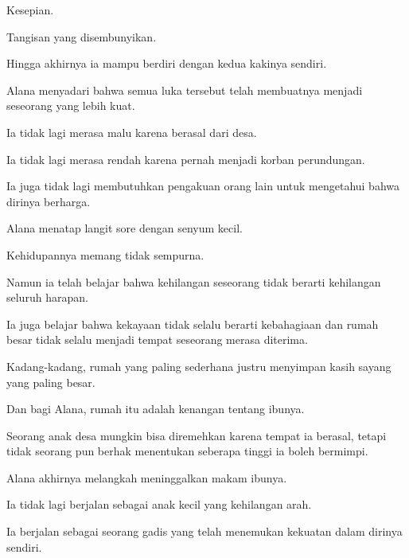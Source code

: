 Kesepian.

Tangisan yang disembunyikan.

Hingga akhirnya ia mampu berdiri dengan kedua kakinya sendiri.

Alana menyadari bahwa semua luka tersebut telah membuatnya menjadi seseorang yang lebih kuat.

Ia tidak lagi merasa malu karena berasal dari desa.

Ia tidak lagi merasa rendah karena pernah menjadi korban perundungan.

Ia juga tidak lagi membutuhkan pengakuan orang lain untuk mengetahui bahwa dirinya berharga.

Alana menatap langit sore dengan senyum kecil.

Kehidupannya memang tidak sempurna.

Namun ia telah belajar bahwa kehilangan seseorang tidak berarti kehilangan seluruh harapan.

Ia juga belajar bahwa kekayaan tidak selalu berarti kebahagiaan dan rumah besar tidak selalu menjadi tempat seseorang merasa diterima.

Kadang-kadang, rumah yang paling sederhana justru menyimpan kasih sayang yang paling besar.

Dan bagi Alana, rumah itu adalah kenangan tentang ibunya.

Seorang anak desa mungkin bisa diremehkan karena tempat ia berasal, tetapi tidak seorang pun berhak menentukan seberapa tinggi ia boleh bermimpi.

Alana akhirnya melangkah meninggalkan makam ibunya.

Ia tidak lagi berjalan sebagai anak kecil yang kehilangan arah.

Ia berjalan sebagai seorang gadis yang telah menemukan kekuatan dalam dirinya sendiri.

\jedahias
